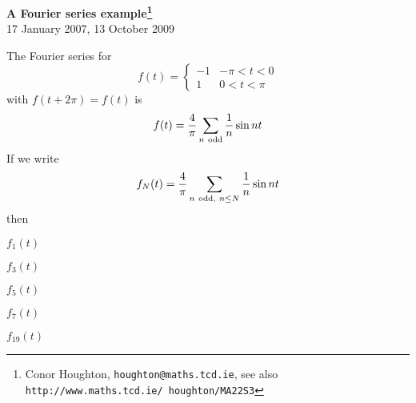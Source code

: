 \documentclass[12pt]{article}
\begin{document}
\begin{center}
{\bf A Fourier series example\footnote{Conor Houghton, {\tt houghton@maths.tcd.ie},
see also {\tt http://www.maths.tcd.ie/ houghton/MA22S3}}}\\[1cm]{} 17 January 2007, 13 October 2009
\end{center}
The Fourier series for 
\begin{equation}
f(t)=\left\{\begin{array}{ll}-1&-\pi<t<0\\1&0<t<\pi\end{array}\right.
\end{equation}
with $f(t+2\pi)=f(t)$ is
\begin{equation}
f(t)=\frac{4}{\pi}\sum_{n\mbox{ {\scriptsize odd}}}\frac{1}{n}\sin{nt}
\end{equation}
If we write
\begin{equation}
f_N(t)=\frac{4}{\pi}\sum_{n\mbox{ {\scriptsize odd,} }n\le N}\frac{1}{n}\sin{nt}
\end{equation}
then
\begin{center}
$f_1(t)$
\end{center}

\begin{center}
$f_3(t)$
\end{center}


\begin{center}
$f_5(t)$
\end{center}


\begin{center}
$f_7(t)$
\end{center}


\begin{center}
$f_{19}(t)$
\end{center}
\end{document}
